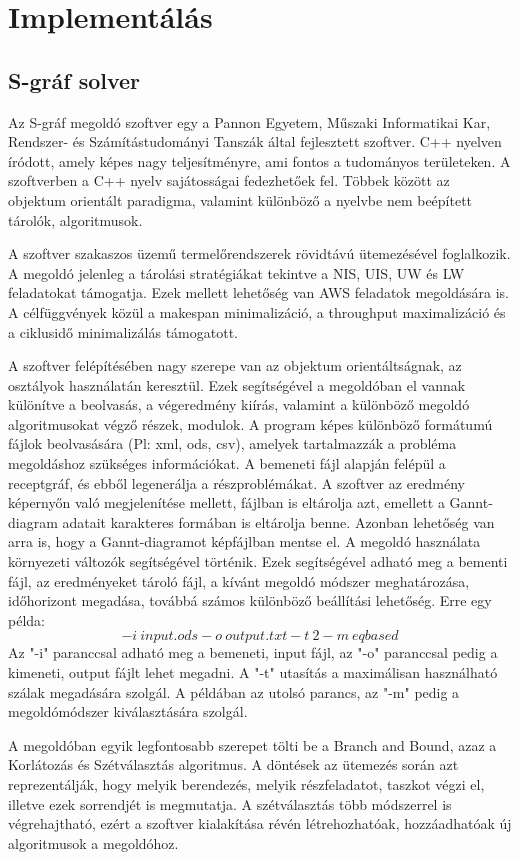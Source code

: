 \chapter{Implementálás}
\section{S-gráf solver}
Az S-gráf megoldó szoftver egy a Pannon Egyetem, Műszaki Informatikai Kar, Rendszer- és Számítástudományi Tanszák által fejlesztett szoftver. C++ nyelven íródott, amely képes nagy teljesítményre, ami fontos a tudományos területeken. A szoftverben a C++ nyelv sajátosságai fedezhetőek fel. Többek között az objektum orientált paradigma, valamint különböző a nyelvbe nem beépített tárolók, algoritmusok.

A szoftver szakaszos üzemű termelőrendszerek rövidtávú ütemezésével foglalkozik. A megoldó jelenleg a tárolási stratégiákat tekintve a NIS, UIS, UW és LW feladatokat támogatja. Ezek mellett lehetőség van AWS feladatok megoldására is. A célfüggvények közül a makespan minimalizáció, a throughput maximalizáció és a ciklusidő minimalizálás támogatott.

A szoftver felépítésében nagy szerepe van az objektum orientáltságnak, az osztályok használatán keresztül. Ezek segítségével a megoldóban el vannak különítve a beolvasás, a végeredmény kiírás, valamint a különböző megoldó algoritmusokat végző részek, modulok. A program képes különböző formátumú fájlok beolvasására (Pl: xml, ods, csv), amelyek tartalmazzák a probléma megoldáshoz szükséges információkat. A bemeneti fájl alapján felépül a receptgráf, és ebből legenerálja a részproblémákat. A szoftver az eredmény képernyőn való megjelenítése mellett, fájlban is eltárolja azt, emellett a Gannt-diagram adatait karakteres formában is eltárolja benne. Azonban lehetőség van arra is, hogy a Gannt-diagramot képfájlban mentse el. A megoldó használata környezeti változók segítségével történik. Ezek segítségével adható meg a bementi fájl, az eredményeket tároló fájl, a kívánt megoldó módszer meghatározása, időhorizont megadása, továbbá számos különböző beállítási lehetőség. Erre egy példa: $$-i\:input.ods -o\: output.txt -t\:2 -m\:eqbased$$ Az "-i" paranccsal adható meg a bemeneti, input fájl, az "-o" paranccsal pedig a kimeneti, output fájlt lehet megadni. A "-t" utasítás a maximálisan használható szálak megadására szolgál. A példában az utolsó parancs, az "-m" pedig a megoldómódszer kiválasztására szolgál.

A megoldóban egyik legfontosabb szerepet tölti be a Branch and Bound, azaz a Korlátozás és Szétválasztás algoritmus. A döntések az ütemezés során azt reprezentálják, hogy melyik berendezés, melyik részfeladatot, taszkot végzi el, illetve ezek sorrendjét is megmutatja. A szétválasztás több módszerrel is végrehajtható, ezért a szoftver kialakítása révén létrehozhatóak, hozzáadhatóak új algoritmusok a megoldóhoz.
